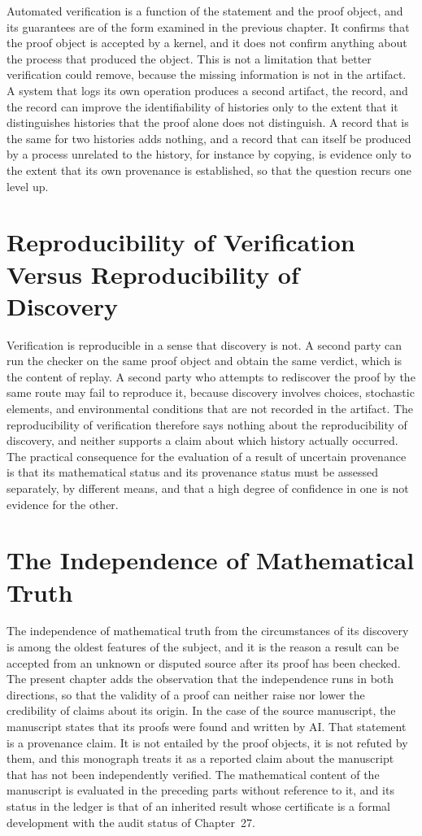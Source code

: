 \documentclass[11pt,letterpaper]{report}
\theoremstyle{plain}
\theoremstyle{definition}
\theoremstyle{remark}
\begin{document}
Automated verification is a function of the statement and the proof object, and its guarantees are of the form examined in the previous chapter. It confirms that the proof object is accepted by a kernel, and it does not confirm anything about the process that produced the object. This is not a limitation that better verification could remove, because the missing information is not in the artifact. A system that logs its own operation produces a second artifact, the record, and the record can improve the identifiability of histories only to the extent that it distinguishes histories that the proof alone does not distinguish. A record that is the same for two histories adds nothing, and a record that can itself be produced by a process unrelated to the history, for instance by copying, is evidence only to the extent that its own provenance is established, so that the question recurs one level up.

\section{Reproducibility of Verification Versus Reproducibility of Discovery}

Verification is reproducible in a sense that discovery is not. A second party can run the checker on the same proof object and obtain the same verdict, which is the content of replay. A second party who attempts to rediscover the proof by the same route may fail to reproduce it, because discovery involves choices, stochastic elements, and environmental conditions that are not recorded in the artifact. The reproducibility of verification therefore says nothing about the reproducibility of discovery, and neither supports a claim about which history actually occurred. The practical consequence for the evaluation of a result of uncertain provenance is that its mathematical status and its provenance status must be assessed separately, by different means, and that a high degree of confidence in one is not evidence for the other.

\section{The Independence of Mathematical Truth}

The independence of mathematical truth from the circumstances of its discovery is among the oldest features of the subject, and it is the reason a result can be accepted from an unknown or disputed source after its proof has been checked. The present chapter adds the observation that the independence runs in both directions, so that the validity of a proof can neither raise nor lower the credibility of claims about its origin. In the case of the source manuscript, the manuscript states that its proofs were found and written by AI. That statement is a provenance claim. It is not entailed by the proof objects, it is not refuted by them, and this monograph treats it as a reported claim about the manuscript that has not been independently verified. The mathematical content of the manuscript is evaluated in the preceding parts without reference to it, and its status in the ledger is that of an inherited result whose certificate is a formal development with the audit status of Chapter~27.
\end{document}
